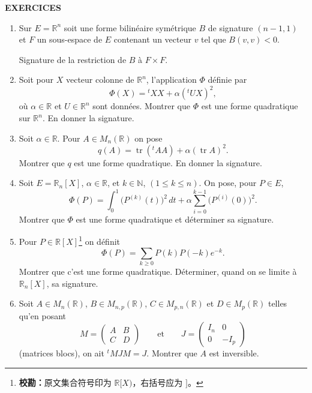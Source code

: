 
\begin{center}
{\Large\sffamily\bfseries\color{BellaLavenderDeep} EXERCICES}
\end{center}
\vspace{0.8em}

\begin{enumerate}[label=\arabic*.,leftmargin=2.2em,itemsep=1.0em]

\item Sur $E=\mathbb R^n$ soit une forme bilinéaire symétrique $B$ de signature $(n-1,1)$ et $F$ un sous-espace de $E$ contenant un vecteur $v$ tel que $B(v,v)<0$.

Signature de la restriction de $B$ à $F\times F$.

\item Soit pour $X$ vecteur colonne de $\mathbb R^n$, l'application $\Phi$ définie par
\[
\Phi(X)={}^tXX+\alpha({}^tUX)^2,
\]
où $\alpha\in\mathbb R$ et $U\in\mathbb R^n$ sont données. Montrer que $\Phi$ est une forme quadratique sur $\mathbb R^n$. En donner la signature.

\item Soit $\alpha\in\mathbb R$. Pour $A\in M_n(\mathbb R)$ on pose
\[
q(A)=\operatorname{tr}({}^tAA)+\alpha(\operatorname{tr}A)^2.
\]
Montrer que $q$ est une forme quadratique. En donner la signature.

\item Soit $E=\mathbb R_n[X]$, $\alpha\in\mathbb R$, et $k\in\mathbb N$, $(1\le k\le n)$. On pose, pour $P\in E$,
\[
\Phi(P)=\int_0^1\bigl(P^{(k)}(t)\bigr)^2\,dt
+\alpha\sum_{i=0}^{k-1}\bigl(P^{(i)}(0)\bigr)^2.
\]
Montrer que $\Phi$ est une forme quadratique et déterminer sa signature.

\item Pour $P\in\mathbb R[X]$\footnote{\textbf{校勘：}原文集合符号印为 $\mathbb R[X)$，右括号应为 $]$。} on définit
\[
\Phi(P)=\sum_{k\ge0}P(k)P(-k)e^{-k}.
\]
Montrer que c'est une forme quadratique. Déterminer, quand on se limite à $\mathbb R_n[X]$, sa signature.

\item Soit $A\in M_n(\mathbb R)$, $B\in M_{n,p}(\mathbb R)$, $C\in M_{p,n}(\mathbb R)$ et $D\in M_p(\mathbb R)$ telles qu'en posant
\[
M=\begin{pmatrix}A&B\\ C&D\end{pmatrix}
\qquad\text{et}\qquad
J=\begin{pmatrix}I_n&0\\0&-I_p\end{pmatrix}
\]
(matrices blocs), on ait ${}^tMJM=J$. Montrer que $A$ est inversible.


\end{enumerate}

